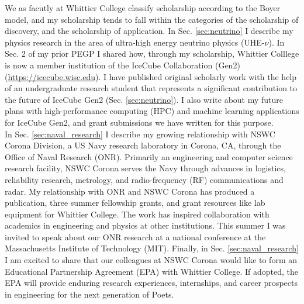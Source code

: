 \documentclass[../../main.tex]{subfiles}
\begin{document}
\label{sec:scholarship}

We as facutly at Whittier College classify scholarship according to the Boyer model, and my scholarship tends to fall within the categories of the scholarship of discovery, and the scholarship of application.  In Sec. \ref{sec:neutrino} I describe my physics research in the area of ultra-high energy neutrino physics (UHE-$\nu$).  In Sec. 2 of my prior PEGP I shared how, through my scholarship, Whittier Colllege is now a member institution of the IceCube Collaboration (Gen2) (\url{https://icecube.wisc.edu}).  I have published original scholarly work with the help of an undergraduate research student that represents a significant contribution to the future of IceCube Gen2 (Sec. \ref{sec:neutrino}).  I also write about my future plans with high-performance computing (HPC) and machine learning applications for IceCube Gen2, and grant submissions we have written for this purpose.
\\
\vspace{0.15cm}
In Sec. \ref{sec:naval_research} I describe my growing relationship with NSWC Corona Division, a US Navy research laboratory in Corona, CA, through the Office of Naval Research (ONR).  Primarily an engineering and computer science research facility, NSWC Corona serves the Navy through advances in logistics, reliability research, metrology, and radio-frequency (RF) communications and radar.  My relationship with ONR and NSWC Corona has produced a publication, three summer fellowship grants, and grant resources like lab equipment for Whittier College.  The work has inspired collaboration with academics in engineering and physics at other institutions.  This summer I was invited to speak about our ONR research at a national conference at the Massachusetts Institute of Technology (MIT).  Finally, in Sec. \ref{sec:naval_research} I am excited to share that our colleagues at NSWC Corona would like to form an Educational Partnership Agreement (EPA) with Whittier College.  If adopted, the EPA will provide enduring research experiences, internships, and career prospects in engineering for the next generation of Poets.

\begin{flushleft}

\end{flushleft}

\begin{flushleft}

\end{flushleft}
\end{document}
